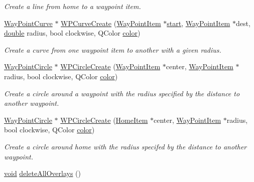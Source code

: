 \begin{DoxyCompactItemize}
\begin{DoxyCompactList}\small\item\em Create a line from home to a waypoint item. \end{DoxyCompactList}\item 
\hyperlink{classmapcontrol_1_1_way_point_curve}{Way\-Point\-Curve} $\ast$ \hyperlink{group___o_p_map_widget_ga18e61fa069c17e42dd0d6743e1e24ce4}{W\-P\-Curve\-Create} (\hyperlink{classmapcontrol_1_1_way_point_item}{Way\-Point\-Item} $\ast$\hyperlink{glext_8h_a13be19455586e95d5a42ed8f054afad2}{start}, \hyperlink{classmapcontrol_1_1_way_point_item}{Way\-Point\-Item} $\ast$dest, \hyperlink{_super_l_u_support_8h_a8956b2b9f49bf918deed98379d159ca7}{double} radius, bool clockwise, Q\-Color \hyperlink{glext_8h_a3ea846f998d64f079b86052b6c4193a8}{color})
\begin{DoxyCompactList}\small\item\em Create a curve from one waypoint item to another with a given radius. \end{DoxyCompactList}\item 
\hyperlink{classmapcontrol_1_1_way_point_circle}{Way\-Point\-Circle} $\ast$ \hyperlink{group___o_p_map_widget_ga8843daa4f0da4fe9343c9cee78bd6a1d}{W\-P\-Circle\-Create} (\hyperlink{classmapcontrol_1_1_way_point_item}{Way\-Point\-Item} $\ast$center, \hyperlink{classmapcontrol_1_1_way_point_item}{Way\-Point\-Item} $\ast$radius, bool clockwise, Q\-Color \hyperlink{glext_8h_a3ea846f998d64f079b86052b6c4193a8}{color})
\begin{DoxyCompactList}\small\item\em Create a circle around a waypoint with the radius specified by the distance to another waypoint. \end{DoxyCompactList}\item 
\hyperlink{classmapcontrol_1_1_way_point_circle}{Way\-Point\-Circle} $\ast$ \hyperlink{group___o_p_map_widget_gad8d5513836ce91c3ab5f84cf81ce2ec8}{W\-P\-Circle\-Create} (\hyperlink{classmapcontrol_1_1_home_item}{Home\-Item} $\ast$center, \hyperlink{classmapcontrol_1_1_way_point_item}{Way\-Point\-Item} $\ast$radius, bool clockwise, Q\-Color \hyperlink{glext_8h_a3ea846f998d64f079b86052b6c4193a8}{color})
\begin{DoxyCompactList}\small\item\em Create a circle around home with the radius specifed by the distance to another waypoint. \end{DoxyCompactList}\item 
\hyperlink{group___u_a_v_objects_plugin_ga444cf2ff3f0ecbe028adce838d373f5c}{void} \hyperlink{group___o_p_map_widget_gaaad12163774b8b524d7d05ed28b01cae}{delete\-All\-Overlays} ()

\end{DoxyCompactItemize}
